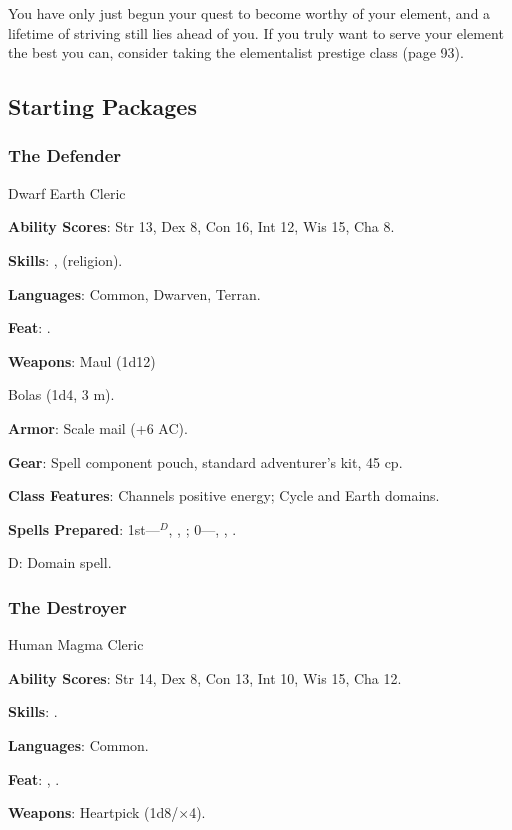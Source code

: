 You have only just begun your quest to become worthy of your element, and a lifetime of striving still lies ahead of you. If you truly want to serve your element the best you can, consider taking the elementalist prestige class (page 93).

\vskip2cm
\subsection{Starting Packages}
\subsubsection{The Defender}

Dwarf Earth Cleric

\textbf{Ability Scores}: Str 13, Dex 8, Con 16, Int 12, Wis 15, Cha 8.

\textbf{Skills}: ,  (religion).

\textbf{Languages}: Common, Dwarven, Terran.

\textbf{Feat}: .

\textbf{Weapons}: Maul (1d12)

Bolas (1d4, 3 m).

\textbf{Armor}: Scale mail (+6 AC).

\textbf{Gear}: Spell component pouch, standard adventurer's kit, 45 cp.

\textbf{Class Features}: Channels positive energy; Cycle and Earth domains.

\textbf{Spells Prepared}: 1st---$^D$, , ; 0---, , .

D: Domain spell.

\subsubsection{The Destroyer}

Human Magma Cleric

\textbf{Ability Scores}: Str 14, Dex 8, Con 13, Int 10, Wis 15, Cha 12.

\textbf{Skills}: .

\textbf{Languages}: Common.

\textbf{Feat}: , .

\textbf{Weapons}: Heartpick (1d8/$\times$4).

